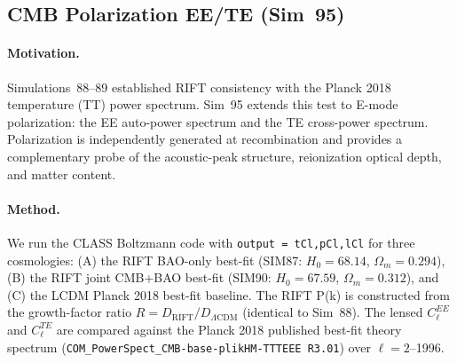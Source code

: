 \documentclass[12pt,a4paper]{article}
\begin{document}
\subsection{CMB Polarization EE/TE (Sim~95)}
\label{sec:obs_polarization}

\paragraph{Motivation.} Simulations~88--89 established RIFT consistency with the
Planck 2018 temperature (TT) power spectrum. Sim~95 extends this test to
E-mode polarization: the EE auto-power spectrum and the TE cross-power spectrum.
Polarization is independently generated at recombination and provides a
complementary probe of the acoustic-peak structure, reionization optical depth,
and matter content.

\paragraph{Method.} We run the CLASS Boltzmann code with \texttt{output~=~tCl,pCl,lCl}
for three cosmologies: (A) the RIFT BAO-only best-fit (SIM87: $H_0=68.14$,
$\Omega_m=0.294$), (B) the RIFT joint CMB+BAO best-fit (SIM90: $H_0=67.59$,
$\Omega_m=0.312$), and (C) the LCDM Planck 2018 best-fit baseline. The RIFT P(k)
is constructed from the growth-factor ratio $R=D_\mathrm{RIFT}/D_{\Lambda\mathrm{CDM}}$
(identical to Sim~88). The lensed $C_\ell^{EE}$ and $C_\ell^{TE}$ are compared
against the Planck 2018 published best-fit theory spectrum
(\texttt{COM\_PowerSpect\_CMB-base-plikHM-TTTEEE~R3.01}) over $\ell=2$--1996.
\end{document}
